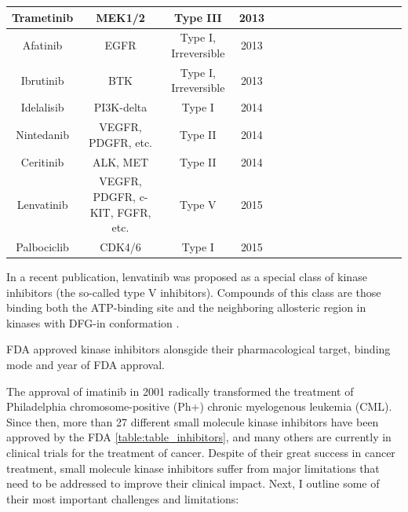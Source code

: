 \documentclass[12pt, b5paper,twoside]{tesi_upf}
\begin{document}
\begin{adjustbox}{max width=\textwidth}
\begin{threeparttable}[htbp]
\begin{tabular}{*{4}{|| c | c  |  c | c  ||}}
 \hline
 Trametinib & MEK1/2 &  Type III   & 2013  \\ 
  \hline
 Afatinib & EGFR &  Type I, Irreversible  & 2013  \\ 
  \hline
 Ibrutinib & BTK &  Type I, Irreversible  & 2013  \\
  \hline
 Idelalisib & PI3K-delta &  Type I   & 2014  \\
  \hline
 Nintedanib & VEGFR, PDGFR, etc.&  Type II   & 2014  \\
 \hline 
 Ceritinib  &   ALK, MET &  Type II  & 2014 \\
 \hline 
 Lenvatinib  &   VEGFR, PDGFR, c-KIT, FGFR, etc. &  Type V \tnote{\textdagger}  & 2015 \\
 \hline 
 Palbociclib  &   CDK4/6 &  Type I  & 2015 \\
 \hline
 
 \end{tabular} 
 
  \begin{tablenotes}
  
  \footnotesize
\item[\textdagger] In a recent publication, lenvatinib was proposed as a special class of kinase inhibitors (the so-called type V inhibitors). Compounds of this class are those binding both the ATP-binding site and the neighboring allosteric region in kinases with DFG-in conformation \cite{Okamoto2015}. 
\end{tablenotes}



\caption{FDA approved kinase inhibitors alonsgide their pharmacological target, binding mode and year of FDA approval.}
\label{table:table_inhibitors} 

 \end{threeparttable}
\end{adjustbox} 
 
\par The approval of imatinib in 2001 radically transformed the treatment of Philadelphia chromosome-positive (Ph+) chronic myelogenous leukemia (CML). Since then, more than 27 different small molecule kinase inhibitors have been approved by the FDA \ref{table:table_inhibitors}, and many others are currently in clinical trials for the treatment of cancer. Despite of their great success in cancer treatment, small molecule kinase inhibitors suffer from major limitations that need to be addressed to improve their clinical impact. Next, I outline some of their most important challenges and limitations:  
\end{document}
